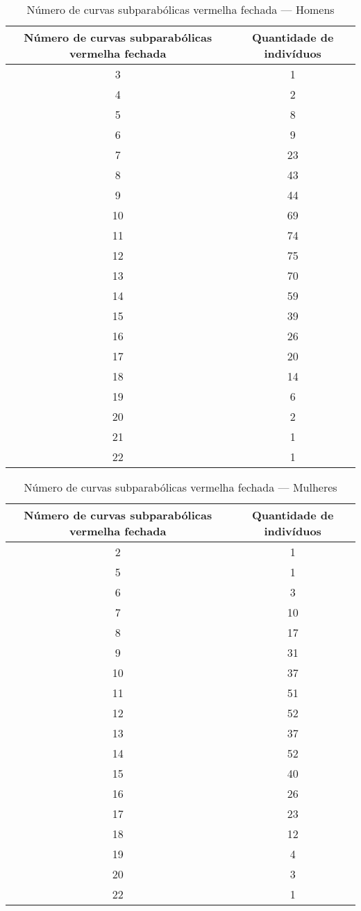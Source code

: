 \documentclass[a4paper,12pt]{article}
\begin{document}
\begin{table}[h!]
\centering
\caption{Número de curvas subparabólicas vermelha fechada — Homens}
\begin{tabular}{c c}
\hline
\textbf{Número de curvas subparabólicas vermelha fechada} & \textbf{Quantidade de indivíduos} \\ 
\hline
3  & 1  \\
4  & 2  \\
5  & 8  \\
6  & 9  \\
7  & 23 \\
8  & 43 \\
9  & 44 \\
10 & 69 \\
11 & 74 \\
12 & 75 \\
13 & 70 \\
14 & 59 \\
15 & 39 \\
16 & 26 \\
17 & 20 \\
18 & 14 \\
19 & 6  \\
20 & 2  \\
21 & 1  \\
22 & 1  \\
\hline
\end{tabular}
\end{table}


\begin{table}[h!]
\centering
\caption{Número de curvas subparabólicas vermelha fechada — Mulheres}
\begin{tabular}{c c}
\hline
\textbf{Número de curvas subparabólicas vermelha fechada} & \textbf{Quantidade de indivíduos} \\ 
\hline
2  & 1  \\
5  & 1  \\
6  & 3  \\
7  & 10 \\
8  & 17 \\
9  & 31 \\
10 & 37 \\
11 & 51 \\
12 & 52 \\
13 & 37 \\
14 & 52 \\
15 & 40 \\
16 & 26 \\
17 & 23 \\
18 & 12 \\
19 & 4  \\
20 & 3  \\
22 & 1  \\
\hline
\end{tabular}
\end{table}
\end{document}
